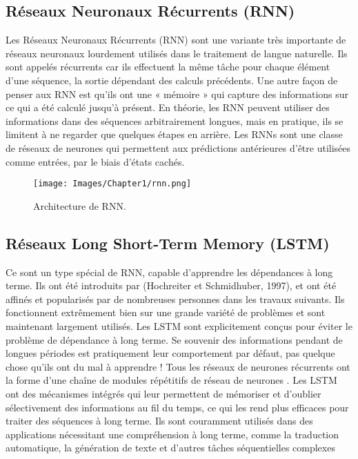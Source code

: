 \begin{itemize}
\begin{itemize}
    \subsection{Réseaux Neuronaux Récurrents (RNN)}
    Les Réseaux Neuronaux Récurrents (RNN) sont une variante très importante de réseaux neuronaux lourdement utilisés dans le traitement de langue naturelle. 
    Ils sont appelés récurrents car ils effectuent la même tâche pour chaque élément d'une séquence, la sortie dépendant des calculs précédents. 
    Une autre façon de penser aux RNN est qu'ils ont une « mémoire » qui capture des informations sur ce qui a été calculé jusqu'à présent. En théorie, les RNN peuvent utiliser des informations dans des séquences arbitrairement longues, mais en pratique, ils se limitent à ne regarder que quelques étapes en arrière.
     Les RNNs sont une classe de réseaux de neurones qui permettent aux prédictions antérieures d'être utilisées comme entrées, par le biais d'états cachés.    
 \begin{figure}[h]
     \centering
     \texttt{[image: Images/Chapter1/rnn.png]}
     \caption{Architecture de RNN.}
     \label{fig:07}
     \end{figure}
     \subsection{Réseaux Long Short-Term Memory (LSTM)}
     Ce sont un type spécial de RNN, capable d'apprendre les dépendances à long terme. 
     Ils ont été introduits par (Hochreiter et Schmidhuber, 1997), et ont été affinés et popularisés par de nombreuses personnes dans les travaux suivants. Ils fonctionnent extrêmement bien sur une grande variété de problèmes et sont maintenant largement utilisés.
     Les LSTM sont explicitement conçus pour éviter le problème de dépendance à long terme. Se souvenir des informations pendant de longues périodes est pratiquement leur comportement par défaut, pas quelque chose qu'ils ont du mal à apprendre !
     Tous les réseaux de neurones récurrents ont la forme d'une chaîne de modules répétitifs de réseau de neurones \cite{10}.
     Les LSTM ont des mécanismes intégrés qui leur permettent de mémoriser et d'oublier sélectivement des informations au fil du temps, ce qui les rend plus efficaces pour traiter des séquences à long terme.
     Ils sont couramment utilisés dans des applications nécessitant une compréhension à long terme, comme la traduction automatique, la génération de texte et d'autres tâches séquentielles complexes
         

\end{itemize}
\end{itemize}
